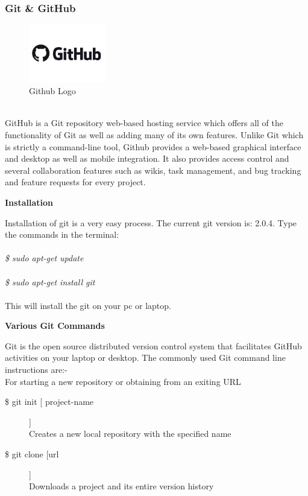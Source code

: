 \subsubsection{Git \& GitHub}
\begin{figure}[!ht]
\centering
\includegraphics[width=0.3\textwidth]{input/images/github}                   
\caption{Github Logo}
\hspace{-1.5em}
\end{figure}
\leavevmode\\
GitHub is a Git repository web-based hosting service which offers all of the functionality of Git as well as adding many of its own features. Unlike Git which is strictly a command-line tool, Github provides a web-based graphical interface and desktop as well as mobile integration. It also provides access control and several collaboration features such as wikis, task management, and bug tracking and feature requests for every project.\\
\begin{center}\textbf{Installation}
\end{center}
Installation of git is a very easy process.
The current git version is: 2.0.4.
Type the commands in the terminal:\\\\
\emph{
\$ sudo apt-get update\\\\
\$ sudo apt-get install git\\\\}
This will install the git on your pc or laptop.

\begin{center}\textbf{Various Git Commands}
\end{center}
Git is the open source distributed version control system that facilitates GitHub activities on your laptop or desktop. The commonly used Git command line instructions are:-\\
For starting a new repository or obtaining from an exiting URL

\begin{description}

\item [\$ git init [ project-name]]\\
Creates a new local repository with the specified name
\item [\$ git clone [url]]\\
Downloads a project and its entire version history\\

\end{description}
